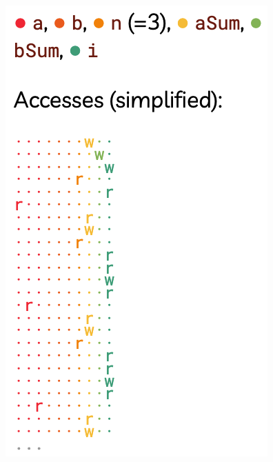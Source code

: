 \documentclass[12pt,a4paper]{article}
\begin{document}
\begin{minipage}{.45\linewidth}
\begin{center}
\includegraphics[width=0.8\columnwidth]{img/locality.png}
\end{center}
\end{minipage}
\end{document}
